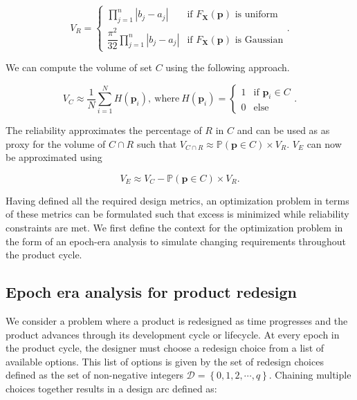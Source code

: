 \begin{equation} \label{eq:Rmontecarlo}
	V_R = {\begin{cases} \prod\limits_{j=1}^{n} \left|b_j - a_j\right| &{\text{if }}F_\mathbf{X}(\mathbf{p})\text{ is uniform}\\\dfrac{\pi^2}{32}\prod\limits_{j=1}^{n} \left|b_j - a_j\right| &{\text{if }}F_\mathbf{X}(\mathbf{p})\text{ is Gaussian}\end{cases}}.
\end{equation}

We can compute the volume of set $C$ using the following approach.

\begin{equation} \label{eq:Cmontecarlo}
	V_C \approx \dfrac{1}{N} {\sum\limits_{i=1}^{N} H\left(\mathbf{p}_i\right)}, ~\mathrm{where}~ H\left(\mathbf{p}_i\right)={\begin{cases}1&{\text{if }}\mathbf{p}_i\in C\\0&{\text{else}}\end{cases}}.
\end{equation}

The reliability approximates the percentage of $R$ in $C$ and can be used as as proxy for the volume of $C\cap R$ such that $V_{C\cap R} \approx \mathbb{P}(\mathbf{p} \in C) \times V_R$. $V_E$ can now be approximated using

\begin{equation} \label{eq:excesssimple}
	V_E \approx V_C - \mathbb{P}(\mathbf{p} \in C) \times V_R.
\end{equation}

Having defined all the required design metrics, an optimization problem in terms of these metrics can be formulated such that excess is minimized while reliability constraints are met. We first define the context for the optimization problem in the form of an epoch-era analysis to simulate changing requirements throughout the product cycle.

\subsection{Epoch era analysis for product redesign} \label{subsec:epochera}

We consider a problem where a product is redesigned as time progresses and the product advances through its development cycle or lifecycle. At every epoch in the product cycle, the designer must choose a redesign choice from a list of available options. This list of options is given by the set of redesign choices defined as the set of non-negative integers $\mathcal{D} = \left\{0,1,2,\cdots,q\right\}$. Chaining multiple choices together results in a design arc defined as:

